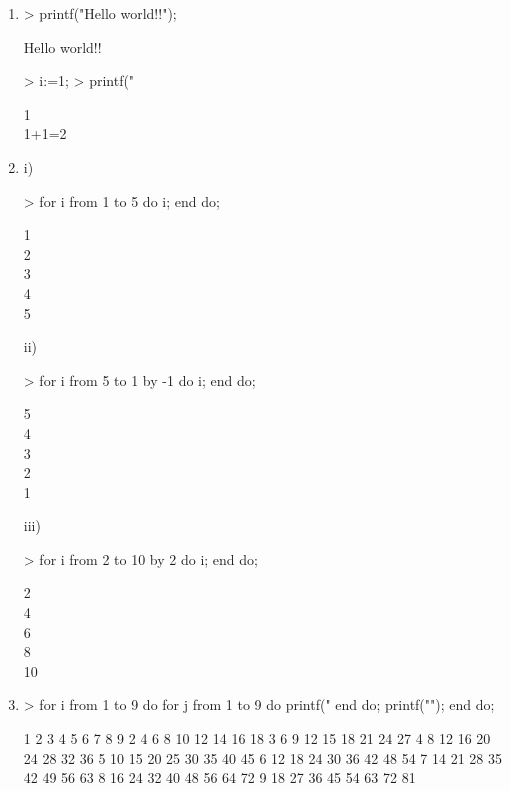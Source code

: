 \begin{enumerate}
\item

\begin{MapleInput}
> printf("Hello world!!\n");
\end{MapleInput}
\begin{MapleError}
Hello world!!
\end{MapleError}
\begin{MapleInput}
> i:=1; 
> printf("%
\end{MapleInput}
\begin{MapleOutputGather}
 1 \notag \\
1+1=2 \notag
\end{MapleOutputGather}

\item
i)
\begin{MapleInput}
> for i from 1 to 5 do
    i;
  end do;
\end{MapleInput}
\begin{MapleOutputGather}
 1 \notag \\
 2 \notag \\
 3 \notag \\
 4 \notag \\
 5 \notag
\end{MapleOutputGather}
ii)
\begin{MapleInput}
> for i from 5 to 1 by -1 do
    i; 
  end do;
\end{MapleInput}
\begin{MapleOutputGather}
 5 \notag \\
 4 \notag \\
 3 \notag \\
 2 \notag \\
 1 \notag
\end{MapleOutputGather}
iii)
\begin{MapleInput}
> for i from 2 to 10 by 2 do
    i; 
  end do;
\end{MapleInput}
\begin{MapleOutputGather}
 2 \notag \\
 4 \notag \\
 6 \notag \\
 8 \notag \\
 10 \notag
\end{MapleOutputGather}

\item
\begin{MapleInput}
> for i from 1 to 9 do 
    for j from 1 to 9 do
      printf("%
    end do;
    printf("\n"); 
  end do;
\end{MapleInput}
\begin{MapleError}
   1   2   3   4   5   6   7   8   9
   2   4   6   8  10  12  14  16  18
   3   6   9  12  15  18  21  24  27
   4   8  12  16  20  24  28  32  36
   5  10  15  20  25  30  35  40  45
   6  12  18  24  30  36  42  48  54
   7  14  21  28  35  42  49  56  63
   8  16  24  32  40  48  56  64  72
   9  18  27  36  45  54  63  72  81
\end{MapleError}


\end{enumerate}
